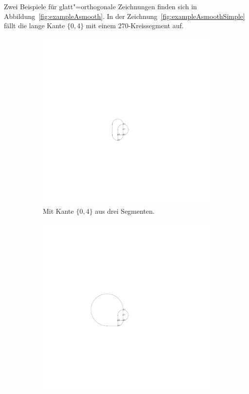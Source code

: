 \documentclass[a4paper]{scrreprt}
\theoremstyle{definition}
\begin{document}
Zwei Beispiele für glatt"=orthogonale Zeichnungen finden sich in Abbildung~\ref{fig:exampleAsmooth}. In der Zeichnung~\ref{fig:exampleAsmoothSimple} fällt die lange Kante $\{0,4\}$ mit einem 270\textdegree-Kreissegment auf.

\begin{figure}[h]
  \centering
\begin{subfigure}[b]{0.3\textwidth}
  \centering
  \includegraphics{exampleA/smoothComplex}
  \caption{Mit Kante $\{0,4\}$ aus drei Segmenten.}
  \label{fig:exampleAsmoothComplex}
\end{subfigure}
  \quad
\begin{subfigure}[b]{0.6\textwidth}
  \centering
  \includegraphics{exampleA/smooth}

\end{subfigure}
\end{figure}
\end{document}
